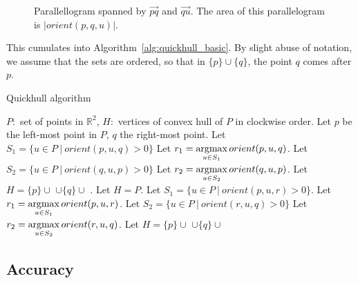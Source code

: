 \begin{figure}[ht]
    \caption{Parallellogram spanned by $\vec{pq}$ and $\vec{qu}$. 
             The area of this parallelogram is $|orient(p, q, u)|$.}
    \label{fig:orient2}
\end{figure}

This cumulates into Algorithm~\ref{alg:quickhull_basic}. By slight abuse
of notation, we assume that the sets are ordered, so that in $\{p\} \cup \{q\}$,
the point $q$ comes after $p$.

\begin{algorithm}[ht]
\begin{algorithmic}[1]
    \caption{Quickhull algorithm}\label{alg:quickhull_basic}
    \Require $P: $ set of points in $\mathbb{R}^2$,
    \Ensure $H: $ vertices of convex hull of $P$ in clockwise order.
    \State Let $p$ be the left-most point in $P$, $q$ the right-most point.
    \State Let $S_1 = \{u \in P \ | \ orient(p, u, q) > 0\}$
    \State Let $r_1 = \operatorname*{argmax}\limits_{u \in S_1}orient(p, u, q)$.
    \State Let $S_2 = \{u \in P \ | \ orient(q, u, p) > 0\}$
    \State Let $r_2 = \operatorname*{argmax}\limits_{u \in S_2}orient(q, u, p)$.
    \State Let $H = \{p\} \cup $ 
            $\cup \{q\} \cup$ .
            \State Let $H = P$.
        \Else
            \State Let $S_1 = \{u \in P \ | \ orient(p, u, r) > 0\}$.
            \State Let $r_1 = \operatorname*{argmax}\limits_{u \in S_1}orient(p, u, r)$.
            \State Let $S_2 = \{u \in P \ | \ orient(r, u, q) > 0\}$
            \State Let $r_2 = \operatorname*{argmax}\limits_{u \in S_2}orient(r, u, q)$.
            \State Let $H = \{p\} \cup $ 
                   $\cup \{q\} \cup$ 
        \EndIf
    \EndFunction
\end{algorithmic}
\end{algorithm}

\subsection{Accuracy}

